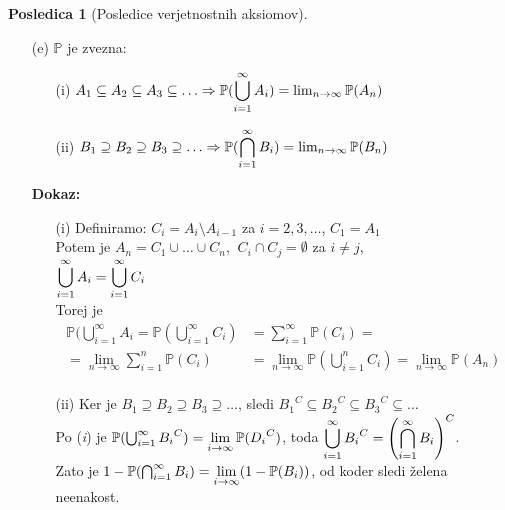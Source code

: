 \documentclass[11pt]{article}
\theoremstyle{definition}
\theoremstyle{definition}
\theoremstyle{definition}
\newtheorem*{posledica}{Posledica}
\begin{document}
\begin{posledica}[Posledice verjetnostnih aksiomov]
\begin{enumerate}
\item[(e)] $\mathbb{P}$ je zvezna:
\begin{enumerate}
	\item[(i)] $A_1 \subseteq A_2 \subseteq A_3 \subseteq \ldots \Rightarrow \mathbb{P}(\mathlarger{\bigcup_{i=1}^{\infty} A_i}) = \lim_{n \rightarrow \infty} \mathbb{P}(A_n)$
	\item[(ii)] $B_1 \supseteq B_2 \supseteq B_3 \supseteq \ldots \Rightarrow \mathbb{P}(\mathlarger{\bigcap_{i=1}^{\infty} B_i}) = \lim_{n \rightarrow \infty} \mathbb{P}(B_n)$
\end{enumerate} 
\textbf{Dokaz:}
\begin{enumerate}
	\item[(i)] Definiramo: $C_i = A_i \setminus A_{i-1}$ za $i = 2, 3, \ldots$, $C_1 = A_1$ \\
	Potem je $A_n = C_1 \cup \ldots \cup C_n$, $~C_i \cap C_j = \emptyset$ za $i \neq j$, \\ 
	$\mathlarger{\bigcup_{i=1}^{\infty} A_i} = \mathlarger{\bigcup_{i=1}^{\infty} C_i}$ \\
	Torej je 
	\begin{align*}
	\mathbb{P}(\bigcup_{i=1}^{\infty} A_i = \mathbb{P}(\bigcup_{i=1}^{\infty} C_i) &= \sum_{i=1}^{\infty} \mathbb{P}(C_i) = \\
	= \lim_{n \rightarrow \infty} \sum_{i=1}^{n} \mathbb{P}(C_i) &= \lim_{n \rightarrow \infty} \mathbb{P}(\bigcup_{i=1}^{n} C_i) = \lim_{n \rightarrow \infty} \mathbb{P}(A_n) \\
	\end{align*}
	\item[(ii)] Ker je $B_1 \supseteq B_2 \supseteq B_3 \supseteq \ldots$, sledi ${B_1}^C \subseteq {B_2}^C \subseteq {B_3}^C \subseteq \ldots$ \\
	Po (\textit{i}) je $\mathbb{P}(\bigcup_{i=1}^{\infty} {B_i}^C) = \mathlarger{\lim_{i \rightarrow \infty} \mathbb{P}({D_i}^C)}$, toda $\mathlarger{\bigcup_{i=1}^{\infty} {B_i}^C = \left( \bigcap_{i=1}^{\infty} B_i \right)^C}$. \\
	Zato je $1 - \mathbb{P}(\bigcap_{i=1}^{\infty} B_i) = \mathlarger{\lim_{i \rightarrow \infty}} (1 - \mathbb{P}(B_i))$, od koder sledi želena neenakost.
\end{enumerate}
\end{enumerate}
\end{posledica}
\vspace{0.5cm}

\end{document}
